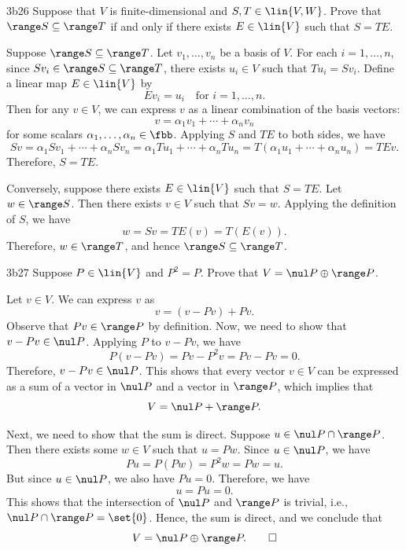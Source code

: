 \begin{exercise}{3b26}
    Suppose that $V$ is finite-dimensional and $S, T \in \lin{V, W}$.
	Prove that $\range S \subseteq \range T$ if and only if there exists $E \in \lin{V}$ such that $S = TE$.

\end{exercise}

\begin{sol}
    Suppose $\range S \subseteq \range T$.
	Let $v_1, \ldots, v_n$ be a basis of $V$.
	For each $i = 1, \ldots, n$, since $Sv_i \in \range S \subseteq \range T$, there exists $u_i \in V$ such that $Tu_i = Sv_i$.
	Define a linear map $E \in \lin{V}$ by
    \[
    	Ev_i = u_i \quad \text{for } i = 1, \ldots, n.
    \]
    Then for any $v \in V$, we can express $v$ as a linear combination of the basis vectors:
    \[
    	v = \alpha_1 v_1 + \cdots + \alpha_n v_n
    \]
    for some scalars $\alpha_1, \ldots, \alpha_n \in \fbb$.
	Applying $S$ and $TE$ to both sides, we have
    \[
    	Sv = \alpha_1 Sv_1 + \cdots + \alpha_n Sv_n = \alpha_1 Tu_1 + \cdots + \alpha_n Tu_n = T(\alpha_1 u_1 + \cdots + \alpha_n u_n) = TEv.
    \]
    Therefore, $S = TE$.

    Conversely, suppose there exists $E \in \lin{V}$ such that $S = TE$.
	Let $w \in \range S$.
	Then there exists $v \in V$ such that $Sv = w$.
	Applying the definition of $S$, we have
    \[
    	w = Sv = TE(v) = T(E(v)).
    \]
    Therefore, $w \in \range T$, and hence $\range S \subseteq \range T$.
\end{sol}

\begin{exercise}{3b27}
    Suppose $P \in \lin{V}$ and $P^2 = P$.
	Prove that $V = \nul P \oplus \range P$.
\end{exercise}

\begin{sol}
    Let $v \in V$.
	We can express $v$ as
    \[
    	v = (v - Pv) + Pv.
    \]
    Observe that $Pv \in \range P$ by definition.
	Now, we need to show that $v - Pv \in \nul P$.
	Applying $P$ to $v - Pv$, we have
    \[
    	P(v - Pv) = Pv - P^2v = Pv - Pv = 0.
    \]
    Therefore, $v - Pv \in \nul P$.
	This shows that every vector $v \in V$ can be expressed as a sum of a vector in $\nul P$ and a vector in $\range P$, which implies that
    \[
    	V = \nul P + \range P.
    \]

    Next, we need to show that the sum is direct.
	Suppose $u \in \nul P \cap \range P$.
	Then there exists some $w \in V$ such that $u = Pw$.
	Since $u \in \nul P$, we have
    \[
    	Pu = P(Pw) = P^2w = Pw = u.
    \]
    But since $u \in \nul P$, we also have $Pu = 0$.
	Therefore, we have
    \[
    	u = Pu = 0.
    \]
    This shows that the intersection of $\nul P$ and $\range P$ is trivial, i.e., $\nul P \cap \range P = \set{0}$.
	Hence, the sum is direct, and we conclude that
    \[
    	V = \nul P \oplus \range P. \qedhere
    \]
\end{sol}

